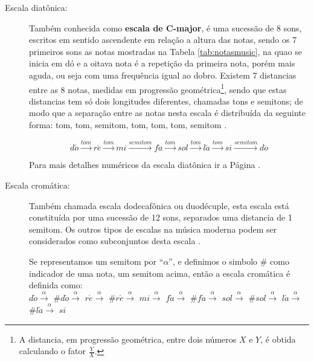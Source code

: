 \begin{description}

\item [Escala diatônica:] \label{sec:pos:Diatonica}
Também conhecida como \textbf{escala de C-major},
é uma sucessão de 8 sons,  escritos em sentido ascendente em relação a altura das notas, 
sendo os 7 primeiros sons as notas mostradas na Tabela \ref{tab:notasmusic}, na quao se inicia em dó
e a oitava nota é a repetição da primeira nota, 
porém mais aguda, ou seja com uma frequência igual ao dobro.
Existem 7 distancias entre as 8 notas, medidas em progressão geométrica\footnote{A 
distancia, em progressão geométrica, entre dois números $X$ e $Y$, é obtida calculando o fator $\frac{Y}{X}$. }, 
sendo que estas distancias tem só dois longitudes diferentes, chamadas tons e semitons;
de modo que a separação entre as notas nesta escala é distribuída da seguinte forma: 
tom, tom, semitom, tom, tom, tom, semitom \cite[pp. 30]{cardoso1973curso}\cite[pp. 753]{apel1969harvard}.
\begin{example}
\begin{equation*}
d\acute{o}\overset{tom}{\rightarrow}
r\acute{e}\overset{tom}{\rightarrow}
mi\overset{semitom}{\rightarrow}
f\acute{a}\overset{tom}{\rightarrow}
sol\overset{tom}{\rightarrow}
l\acute{a}\overset{tom}{\rightarrow}
si\overset{semitom}{\rightarrow}
d\acute{o}
\end{equation*}
\end{example}
Para mais detalhes numéricos da escala diatônica ir a Página \pageref{ref:paginadiatonicanumerica}.


\item [Escala cromática:] \label{sec:pos:Cromatica}
Também chamada escala dodecafônica ou duodécuple, 
esta escala está constituída por uma sucessão de 12 sons, separados uma distancia de 1 semitom.
Os outros tipos de escalas na música moderna podem ser considerados como subconjuntos desta escala \cite[pp. 753]{apel1969harvard}.
\begin{example} 
Se representamos um semitom por ``$\alpha$'', 
e definimos o simbolo $\#$ como indicador de uma nota, um semitom acima, 
então a escala cromática é definida como:\\
$d\acute{o}\overset{\alpha}{\rightarrow}$
$\#d\acute{o}\overset{\alpha}{\rightarrow}$
$r\acute{e}\overset{\alpha}{\rightarrow}$
$\#r\acute{e}\overset{\alpha}{\rightarrow}$
$mi\overset{\alpha}{\rightarrow}$
$f\acute{a}\overset{\alpha}{\rightarrow}$
$\#f\acute{a}\overset{\alpha}{\rightarrow}$
$sol\overset{\alpha}{\rightarrow}$
$\#sol\overset{\alpha}{\rightarrow}$
$l\acute{a}\overset{\alpha}{\rightarrow}$
$\#l\acute{a}\overset{\alpha}{\rightarrow}$
$si$
\end{example}
\end{description}


